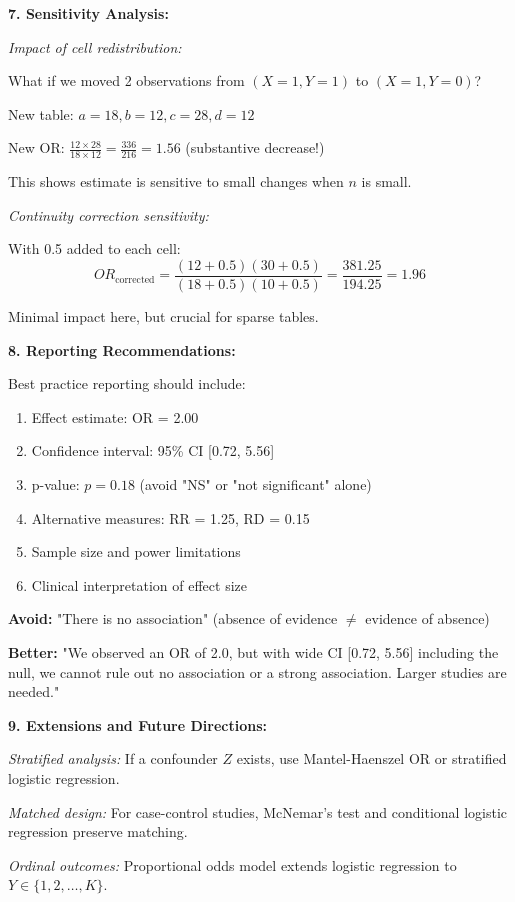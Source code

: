 \documentclass[12pt]{article}
\begin{document}
\begin{explanation}
\textbf{7. Sensitivity Analysis:}

\textit{Impact of cell redistribution:}

What if we moved 2 observations from $(X=1, Y=1)$ to $(X=1, Y=0)$?

New table: $a=18, b=12, c=28, d=12$

New OR: $\frac{12 \times 28}{18 \times 12} = \frac{336}{216} = 1.56$ (substantive decrease!)

This shows estimate is sensitive to small changes when $n$ is small.

\textit{Continuity correction sensitivity:}

With 0.5 added to each cell:
\[
OR_{\text{corrected}} = \frac{(12+0.5)(30+0.5)}{(18+0.5)(10+0.5)} = \frac{381.25}{194.25} = 1.96
\]

Minimal impact here, but crucial for sparse tables.

\textbf{8. Reporting Recommendations:}

Best practice reporting should include:
\begin{enumerate}
\item Effect estimate: OR = 2.00
\item Confidence interval: 95\% CI [0.72, 5.56]
\item p-value: $p = 0.18$ (avoid "NS" or "not significant" alone)
\item Alternative measures: RR = 1.25, RD = 0.15
\item Sample size and power limitations
\item Clinical interpretation of effect size
\end{enumerate}

\textbf{Avoid:} "There is no association" (absence of evidence $\neq$ evidence of absence)

\textbf{Better:} "We observed an OR of 2.0, but with wide CI [0.72, 5.56] including the null, we cannot rule out no association or a strong association. Larger studies are needed."

\textbf{9. Extensions and Future Directions:}

\textit{Stratified analysis:} If a confounder $Z$ exists, use Mantel-Haenszel OR or stratified logistic regression.

\textit{Matched design:} For case-control studies, McNemar's test and conditional logistic regression preserve matching.

\textit{Ordinal outcomes:} Proportional odds model extends logistic regression to $Y \in \{1, 2, \ldots, K\}$.


\end{explanation}
\end{document}
